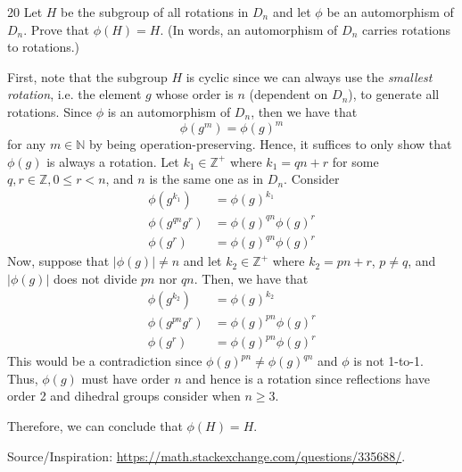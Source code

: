 \newpage
\begin{hwproblem}
{20}{
    Let $H$ be the subgroup of all rotations in $D_n$ and let $\phi$ be an automorphism of $D_n$. Prove that $\phi(H)=H$. (In words, an automorphism of $D_n$ carries rotations to rotations.)
}


First, note that the subgroup \(H\) is cyclic since we can always use the \textit{smallest rotation}, i.e. the element \(g\) whose order is \(n\) (dependent on \(D_n\)), to generate all rotations. Since \(\phi\) is an automorphism of \(D_n\), then we have that
\[
    \phi(g^m) = \phi(g)^m
\]
for any \(m \in \mathbb{N}\) by being operation-preserving. Hence, it suffices to only show that \(\phi(g)\) is always a rotation. Let \(k_1 \in \mathbb{Z}^+\) where \(k_1 = qn + r\) for some \(q, r \in \mathbb{Z}, 0 \leq r < n\), and \(n\) is the same one as in \(D_n\). Consider
\[
\begin{aligned}
    \phi(g^{k_1}) &= \phi(g)^{k_1} \\
    \phi(g^{qn}g^r) &= \phi(g)^{qn}\phi(g)^r \\
    \phi(g^r) &= \phi(g)^{qn}\phi(g)^r
\end{aligned}
\]
Now, suppose that \(|\phi(g)| \neq n\) and let \(k_2 \in \mathbb{Z}^+\) where \(k_2 = pn + r\), \(p \neq q\), and \(|\phi(g)|\) does not divide \(pn\) nor \(qn\). Then, we have that
\[
\begin{aligned}
    \phi(g^{k_2}) &= \phi(g)^{k_2} \\
    \phi(g^{pn}g^r) &= \phi(g)^{pn}\phi(g)^r \\
    \phi(g^r) &= \phi(g)^{pn}\phi(g)^r
\end{aligned}
\]
This would be a contradiction since \(\phi(g)^{pn} \neq \phi(g)^{qn}\) and \(\phi\) is not 1-to-1. Thus, \(\phi(g)\) must have order \(n\) and hence is a rotation since reflections have order 2 and dihedral groups consider when \(n \geq 3\).

Therefore, we can conclude that \(\phi(H) = H\).

Source/Inspiration: \href{https://math.stackexchange.com/questions/335688/let-h-be-the-subgroup-of-all-rotations-in-d-n-and-let-phi-be-an-automor}{https://math.stackexchange.com/questions/335688/}.
\end{hwproblem}

